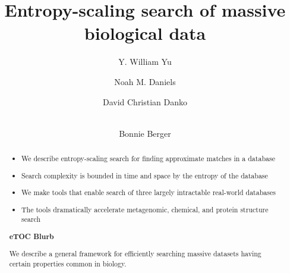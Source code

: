 \documentclass[11pt]{elsarticle}
\theoremstyle{definition}
\theoremstyle{remark}
\numberwithin{equation}{section}
\begin{document}
\begin{frontmatter}

\title{ %
Entropy-scaling search of massive biological data}

\author[mitmath,mitcsail]{Y. William Yu}
\author[mitmath,mitcsail]{Noah M. Daniels}
\author[mitcsail]{David Christian Danko}
\author[mitmath,mitcsail]{\\Bonnie Berger}
\address[mitmath]{Department of Mathematics, Massachusetts Institute of Technology, Cambridge, Massachusetts 02139}
\address[mitcsail]{Computer Science and AI Lab, Massachusetts Institute of Technology, Cambridge, Massachusetts 02139}






\begin{abstract}
    \begin{itemize}
        \item We describe entropy-scaling search for finding approximate matches in a database
        \item Search complexity is bounded in time and space by the entropy of the database
        \item We make tools that enable search of three largely intractable real-world databases
        \item The tools dramatically accelerate metagenomic, chemical, and protein structure search
    \end{itemize}
\noindent\unskip\textbf{eTOC Blurb}
\par\medskip\noindent\unskip\ignorespaces
We describe a general
framework for efficiently searching
massive datasets having certain
properties common in biology.
\end{abstract}

\end{frontmatter}
\end{document}
